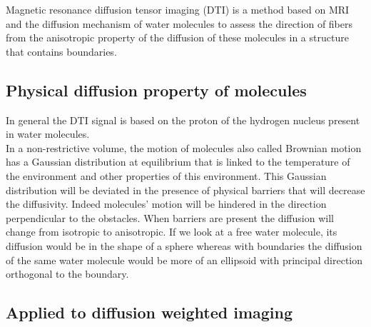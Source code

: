 Magnetic resonance diffusion tensor imaging (DTI) is a method based on MRI and the diffusion mechanism of water molecules to assess the direction of fibers from the anisotropic property of the diffusion of these molecules in a structure that contains boundaries.\\

\subsection{Physical diffusion property of molecules}

In general the DTI signal is based on the proton of the hydrogen nucleus present in water molecules.\\
In a non-restrictive volume, the motion of molecules also called Brownian motion has a Gaussian distribution at equilibrium that is linked to the temperature of the environment and other properties of this environment. This Gaussian distribution will be deviated in the presence of physical barriers that will decrease the diffusivity. Indeed molecules' motion will be hindered in the direction perpendicular to the obstacles. When barriers are present the diffusion will change from isotropic to anisotropic. If we look at a free water molecule, its diffusion would be in the shape of a sphere whereas with boundaries the diffusion of the same water molecule would be more of an ellipsoid with principal direction orthogonal to the boundary.

\subsection{Applied to diffusion weighted imaging} \label{dw_imaging}

